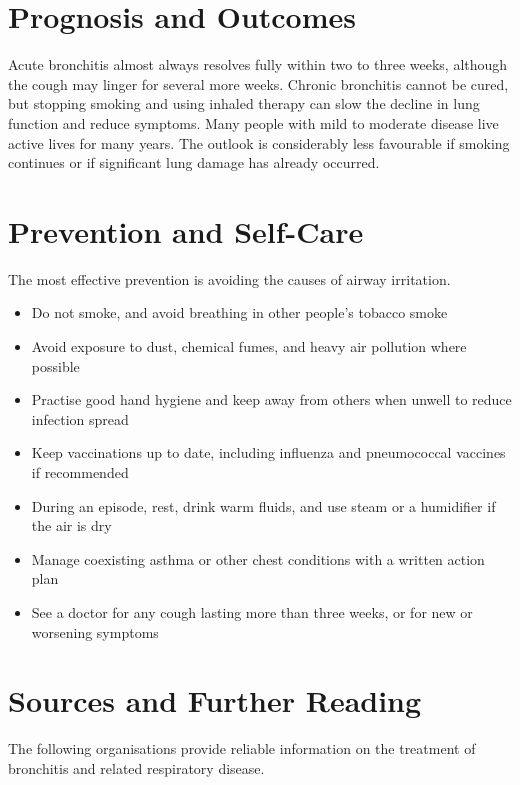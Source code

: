 \section*{Prognosis and Outcomes}
Acute bronchitis almost always resolves fully within two to three weeks, although the cough may linger for several more weeks. Chronic bronchitis cannot be cured, but stopping smoking and using inhaled therapy can slow the decline in lung function and reduce symptoms. Many people with mild to moderate disease live active lives for many years. The outlook is considerably less favourable if smoking continues or if significant lung damage has already occurred.

\section*{Prevention and Self-Care}
The most effective prevention is avoiding the causes of airway irritation.

\begin{itemize}
    \item Do not smoke, and avoid breathing in other people's tobacco smoke
    \item Avoid exposure to dust, chemical fumes, and heavy air pollution where possible
    \item Practise good hand hygiene and keep away from others when unwell to reduce infection spread
    \item Keep vaccinations up to date, including influenza and pneumococcal vaccines if recommended
    \item During an episode, rest, drink warm fluids, and use steam or a humidifier if the air is dry
    \item Manage coexisting asthma or other chest conditions with a written action plan
    \item See a doctor for any cough lasting more than three weeks, or for new or worsening symptoms
\end{itemize}

\section*{Sources and Further Reading}
The following organisations provide reliable information on the treatment of bronchitis and related respiratory disease.

